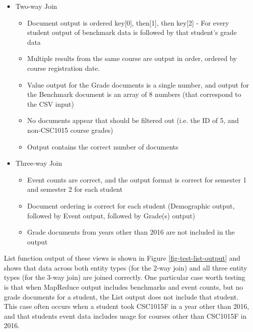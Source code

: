 \begin{itemize}
  \item Two-way Join
        \begin{itemize}
          \item Document output is ordered key[0], then[1], then key[2] - For every student output of benchmark data is followed by that student's grade data
          \item Multiple results from the same course are output in order, ordered by course registration date.
          \item Value output for the Grade documents is a single number, and output for the Benchmark document is an array of 8 numbers (that correspond to the CSV input)
          \item No documents appear that should be filtered out (i.e. the ID of 5, and non-CSC1015 course grades)
          \item Output contains the correct number of documents
        \end{itemize}
  \item Three-way Join
        \begin{itemize}
          \item Event counts are correct, and the output format is correct for semester 1 and semester 2 for each student
          \item Document ordering is correct for each student (Demographic output, followed by Event output, followed by Grade(s) output)
          \item Grade documents from years other than 2016 are not included in the output
        \end{itemize}
\end{itemize}

List function output of these views is shown in Figure \ref{fig-test-list-output} and shows that data across both entity types (for the 2-way join) and all three entity types (for the 3-way join) are joined correctly. One particular case worth testing is that when MapReduce output includes benchmarks and event counts, but no grade documents for a student, the List output does not include that student. This case often occurs when a student took CSC1015F in a year other than 2016, and that students event data includes usage for courses other than CSC1015F in 2016.

\newpage



